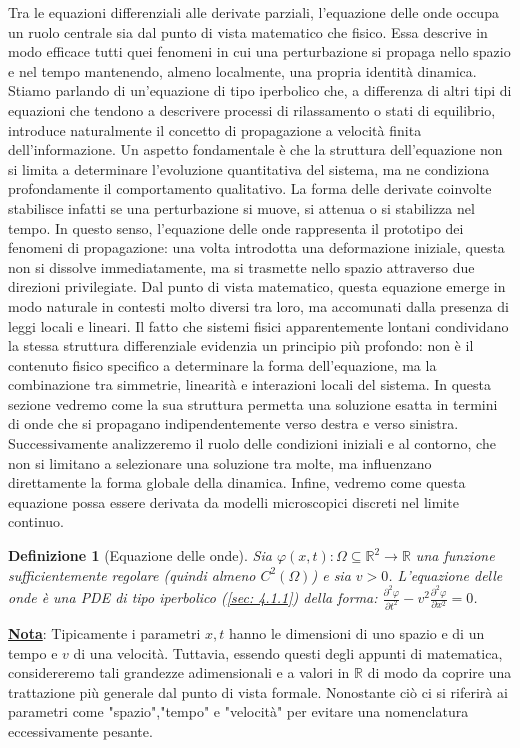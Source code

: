 \documentclass[a4paper,12pt]{report}
\newtheorem{definizione}{Definizione}[chapter]
\newcommand{\gt}{>}
\newcommand{\pdd}[2]{\frac{\partial^2 #1}{\partial #2^2}}
\begin{document}
Tra le equazioni differenziali alle derivate parziali, l’equazione delle onde occupa un ruolo centrale sia dal punto di vista matematico che fisico. Essa descrive in modo efficace tutti quei fenomeni in cui una perturbazione si propaga nello spazio e nel tempo mantenendo, almeno localmente, una propria identità dinamica. Stiamo parlando di un'equazione di tipo iperbolico che, a differenza di altri tipi di equazioni che tendono a descrivere processi di rilassamento o stati di equilibrio, introduce naturalmente il concetto di propagazione a velocità finita dell'informazione.
Un aspetto fondamentale è che la struttura dell’equazione non si limita a determinare l’evoluzione quantitativa del sistema, ma ne condiziona profondamente il comportamento qualitativo. La forma delle derivate coinvolte stabilisce infatti se una perturbazione si muove, si attenua o si stabilizza nel tempo. In questo senso, l’equazione delle onde rappresenta il prototipo dei fenomeni di propagazione: una volta introdotta una deformazione iniziale, questa non si dissolve immediatamente, ma si trasmette nello spazio attraverso due direzioni privilegiate. Dal punto di vista matematico, questa equazione emerge in modo naturale in contesti molto diversi tra loro, ma accomunati dalla presenza di leggi locali e lineari. Il fatto che sistemi fisici apparentemente lontani condividano la stessa struttura differenziale evidenzia un principio più profondo: non è il contenuto fisico specifico a determinare la forma dell’equazione, ma la combinazione tra simmetrie, linearità e interazioni locali del sistema.
In questa sezione vedremo come la sua struttura permetta una soluzione esatta in termini di onde che si propagano indipendentemente verso destra e verso sinistra. Successivamente analizzeremo il ruolo delle condizioni iniziali e al contorno, che non si limitano a selezionare una soluzione tra molte, ma influenzano direttamente la forma globale della dinamica. Infine, vedremo come questa equazione possa essere derivata da modelli microscopici discreti nel limite continuo. 

\begin{definizione}[Equazione delle onde]\label{def: 4.8}
    Sia $\varphi(x,t): \Omega\subseteq\mathbb{R}^2\to \mathbb{R}$ una funzione sufficientemente regolare (quindi almeno $C^2(\Omega)$) e sia $v\gt 0$. L'equazione delle onde è una PDE di tipo iperbolico (\ref{sec: 4.1.1}) della forma: $\displaystyle\pdd{\varphi}{t}-v^2\pdd{\varphi}{x}=0$.
\end{definizione}

\underline{\textbf{Nota}}: Tipicamente i parametri $x,t$ hanno le dimensioni di uno spazio e di un tempo e $v$ di una velocità. Tuttavia, essendo questi degli appunti di matematica, considereremo tali grandezze adimensionali e a valori in $\mathbb{R}$ di modo da coprire una trattazione più generale dal punto di vista formale. Nonostante ciò ci si riferirà ai parametri come "spazio","tempo" e "velocità" per evitare una nomenclatura eccessivamente pesante.
\end{document}
